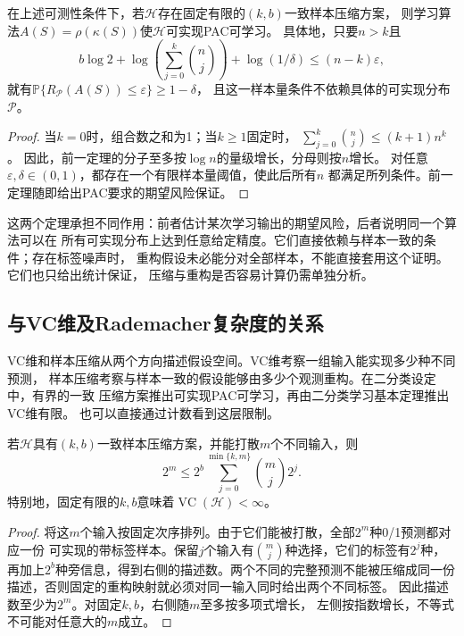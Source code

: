 \begin{theorem}[有界样本压缩推出PAC可学习]
\label{thm:compression-pac-learning}
在上述可测性条件下，若$\mathcal H$存在固定有限的$(k,b)$一致样本压缩方案，
则学习算法$A(S)=\rho(\kappa(S))$使$\mathcal H$可实现PAC可学习。
具体地，只要$n>k$且
\[
 b\log2+\log\!\left(\sum_{j=0}^k\binom nj\right)+\log(1/\delta)
 \leq(n-k)\varepsilon,
\]
就有$\mathbb P\{R_{\mathcal P}(A(S))\leq\varepsilon\}\geq1-\delta$，
且这一样本量条件不依赖具体的可实现分布$\mathcal P$。
\end{theorem}

\begin{proof}
当$k=0$时，组合数之和为1；当$k\geq1$固定时，
$\sum_{j=0}^k\binom nj\leq(k+1)n^k$。
因此，前一定理的分子至多按$\log n$的量级增长，分母则按$n$增长。
对任意$\varepsilon,\delta\in(0,1)$，都存在一个有限样本量阈值，使此后所有$n$
都满足所列条件。前一定理随即给出PAC要求的期望风险保证。
\end{proof}

这两个定理承担不同作用：前者估计某次学习输出的期望风险，后者说明同一个算法可以在
所有可实现分布上达到任意给定精度。它们直接依赖与样本一致的条件；存在标签噪声时，
重构假设未必能分对全部样本，不能直接套用这个证明。它们也只给出统计保证，
压缩与重构是否容易计算仍需单独分析。

\subsection{与VC维及Rademacher复杂度的关系}

VC维和样本压缩从两个方向描述假设空间。VC维考察一组输入能实现多少种不同预测，
样本压缩考察与样本一致的假设能够由多少个观测重构。在二分类设定中，有界的一致
压缩方案推出可实现PAC可学习，再由二分类学习基本定理推出VC维有限。
也可以直接通过计数看到这层限制。

\begin{theorem}[压缩规模对打散的限制]
\label{thm:compression-shattering-count}
若$\mathcal H$具有$(k,b)$一致样本压缩方案，并能打散$m$个不同输入，则
\[
 2^m\leq 2^b\sum_{j=0}^{\min\{k,m\}}\binom mj2^j.
\]
特别地，固定有限的$k,b$意味着$\operatorname{VC}(\mathcal H)<\infty$。
\end{theorem}

\begin{proof}
将这$m$个输入按固定次序排列。由于它们能被打散，全部$2^m$种0/1预测都对应一份
可实现的带标签样本。保留$j$个输入有$\binom mj$种选择，它们的标签有$2^j$种，
再加上$2^b$种旁信息，得到右侧的描述数。两个不同的完整预测不能被压缩成同一份
描述，否则固定的重构映射就必须对同一输入同时给出两个不同标签。
因此描述数至少为$2^m$。对固定$k,b$，右侧随$m$至多按多项式增长，
左侧按指数增长，不等式不可能对任意大的$m$成立。
\end{proof}

